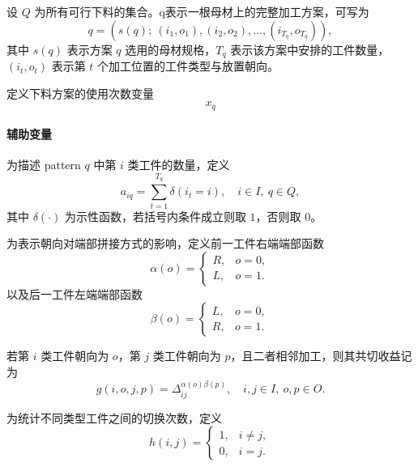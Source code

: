 \documentclass[UTF8]{ctexart}
\begin{document}
设 $Q$ 为所有可行下料的集合。q表示一根母材上的完整加工方案，可写为
\begin{equation}
q=\left(s(q);\ (i_1,o_1),(i_2,o_2),\ldots,(i_{T_q},o_{T_q})\right),
\label{eq:p3_pattern}
\end{equation}
其中 $s(q)$ 表示方案 $q$ 选用的母材规格，$T_q$ 表示该方案中安排的工件数量，$(i_t,o_t)$ 表示第 $t$ 个加工位置的工件类型与放置朝向。

定义下料方案的使用次数变量
\begin{equation}
x_q
\label{eq:p3}
\end{equation}

\paragraph{辅助变量}

为描述 pattern $q$ 中第 $i$ 类工件的数量，定义
\begin{equation}
a_{iq}=\sum_{t=1}^{T_q} \delta(i_t=i),
\quad i\in I,\ q\in Q,
\label{eq:p3_aiq}
\end{equation}
其中 $\delta(\cdot)$ 为示性函数，若括号内条件成立则取 $1$，否则取 $0$。

为表示朝向对端部拼接方式的影响，定义前一工件右端端部函数
\begin{equation}
\alpha(o)=
\begin{cases}
R, & o=0,\\
L, & o=1.
\end{cases}
\label{eq:alpha}
\end{equation}
以及后一工件左端端部函数
\begin{equation}
\beta(o)=
\begin{cases}
L, & o=0,\\
R, & o=1.
\end{cases}
\label{eq:beta}
\end{equation}

若第 $i$ 类工件朝向为 $o$，第 $j$ 类工件朝向为 $p$，且二者相邻加工，则其共切收益记为
\begin{equation}
g(i,o,j,p)=\Delta_{ij}^{\alpha(o)\beta(p)},
\quad i,j\in I,\ o,p\in O.
\label{eq:p3_g}
\end{equation}

为统计不同类型工件之间的切换次数，定义
\begin{equation}
h(i,j)=
\begin{cases}
1, & i\neq j,\\
0, & i=j.
\end{cases}
\label{eq:p3_h}
\end{equation}
\end{document}
